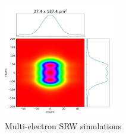 \documentclass{iucr}              %
\begin{document}
\begin{figure}
    \includegraphics[width=0.45\textwidth]{figures/case4_srw.png}
    \caption{Multi-electron SRW simulations}
\end{figure}

\vspace{3cm}
\end{document}
